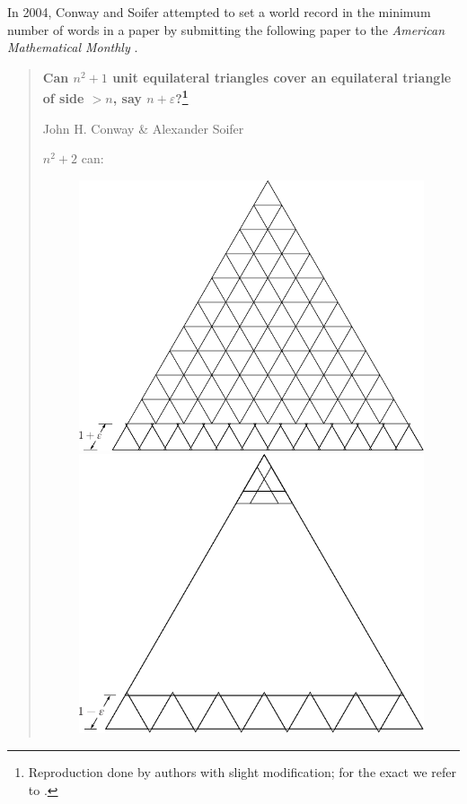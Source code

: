 \documentclass[a4paper]{amsart}
\theoremstyle{plain}
\theoremstyle{definition}
\begin{document}
In 2004, Conway and Soifer attempted to set a world record in the minimum number of words in a paper by submitting the following paper to the \emph{American Mathematical Monthly} \cite{soifer2009coffee}.
\\
\begin{quote}
\begin{center}
\Large \textbf{Can \(n^2 + 1\) unit equilateral triangles cover an equilateral triangle of side \(> n\), say \(n + \varepsilon\)?\footnote{Reproduction done by authors with slight modification; for the exact we refer to \cite{soifer2009coffee}.}}
\end{center}

\begin{center}
John H. Conway \& Alexander Soifer
\end{center}

\(n^2 + 2\) can:
\begin{figure}[h]
   \begin{minipage}{0.5\textwidth}
     \centering
     \includegraphics[width=0.9\linewidth]{triangle1.pdf}
     \caption{}
     \label{fig:triangle1}
   \end{minipage}\hfill
   \begin{minipage}{0.5\textwidth}
     \centering
     \includegraphics[width=0.9\linewidth]{triangle2.pdf}
     \caption{}
     \label{fig:triangle2}
   \end{minipage}
\end{figure}
\end{quote}
\end{document}
